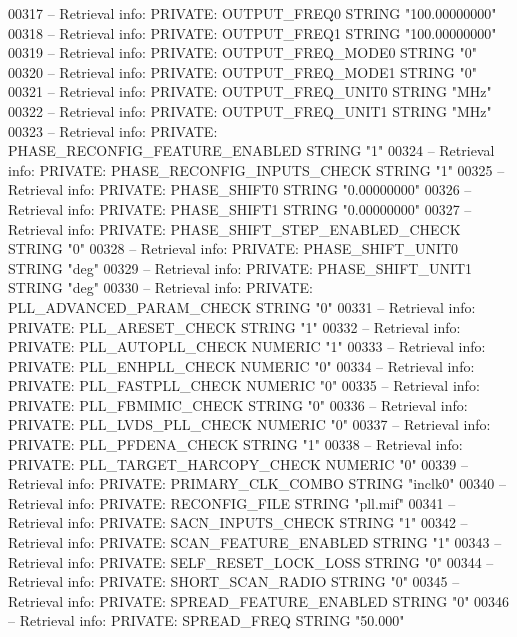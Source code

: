 \begin{DoxyCode}
{00317 \textcolor{keyword}{-- Retrieval info: PRIVATE: OUTPUT\_FREQ0 STRING "100.00000000"}
00318 \textcolor{keyword}{-- Retrieval info: PRIVATE: OUTPUT\_FREQ1 STRING "100.00000000"}
00319 \textcolor{keyword}{-- Retrieval info: PRIVATE: OUTPUT\_FREQ\_MODE0 STRING "0"}
00320 \textcolor{keyword}{-- Retrieval info: PRIVATE: OUTPUT\_FREQ\_MODE1 STRING "0"}
00321 \textcolor{keyword}{-- Retrieval info: PRIVATE: OUTPUT\_FREQ\_UNIT0 STRING "MHz"}
00322 \textcolor{keyword}{-- Retrieval info: PRIVATE: OUTPUT\_FREQ\_UNIT1 STRING "MHz"}
00323 \textcolor{keyword}{-- Retrieval info: PRIVATE: PHASE\_RECONFIG\_FEATURE\_ENABLED STRING "1"}
00324 \textcolor{keyword}{-- Retrieval info: PRIVATE: PHASE\_RECONFIG\_INPUTS\_CHECK STRING "1"}
00325 \textcolor{keyword}{-- Retrieval info: PRIVATE: PHASE\_SHIFT0 STRING "0.00000000"}
00326 \textcolor{keyword}{-- Retrieval info: PRIVATE: PHASE\_SHIFT1 STRING "0.00000000"}
00327 \textcolor{keyword}{-- Retrieval info: PRIVATE: PHASE\_SHIFT\_STEP\_ENABLED\_CHECK STRING "0"}
00328 \textcolor{keyword}{-- Retrieval info: PRIVATE: PHASE\_SHIFT\_UNIT0 STRING "deg"}
00329 \textcolor{keyword}{-- Retrieval info: PRIVATE: PHASE\_SHIFT\_UNIT1 STRING "deg"}
00330 \textcolor{keyword}{-- Retrieval info: PRIVATE: PLL\_ADVANCED\_PARAM\_CHECK STRING "0"}
00331 \textcolor{keyword}{-- Retrieval info: PRIVATE: PLL\_ARESET\_CHECK STRING "1"}
00332 \textcolor{keyword}{-- Retrieval info: PRIVATE: PLL\_AUTOPLL\_CHECK NUMERIC "1"}
00333 \textcolor{keyword}{-- Retrieval info: PRIVATE: PLL\_ENHPLL\_CHECK NUMERIC "0"}
00334 \textcolor{keyword}{-- Retrieval info: PRIVATE: PLL\_FASTPLL\_CHECK NUMERIC "0"}
00335 \textcolor{keyword}{-- Retrieval info: PRIVATE: PLL\_FBMIMIC\_CHECK STRING "0"}
00336 \textcolor{keyword}{-- Retrieval info: PRIVATE: PLL\_LVDS\_PLL\_CHECK NUMERIC "0"}
00337 \textcolor{keyword}{-- Retrieval info: PRIVATE: PLL\_PFDENA\_CHECK STRING "1"}
00338 \textcolor{keyword}{-- Retrieval info: PRIVATE: PLL\_TARGET\_HARCOPY\_CHECK NUMERIC "0"}
00339 \textcolor{keyword}{-- Retrieval info: PRIVATE: PRIMARY\_CLK\_COMBO STRING "inclk0"}
00340 \textcolor{keyword}{-- Retrieval info: PRIVATE: RECONFIG\_FILE STRING "pll.mif"}
00341 \textcolor{keyword}{-- Retrieval info: PRIVATE: SACN\_INPUTS\_CHECK STRING "1"}
00342 \textcolor{keyword}{-- Retrieval info: PRIVATE: SCAN\_FEATURE\_ENABLED STRING "1"}
00343 \textcolor{keyword}{-- Retrieval info: PRIVATE: SELF\_RESET\_LOCK\_LOSS STRING "0"}
00344 \textcolor{keyword}{-- Retrieval info: PRIVATE: SHORT\_SCAN\_RADIO STRING "0"}
00345 \textcolor{keyword}{-- Retrieval info: PRIVATE: SPREAD\_FEATURE\_ENABLED STRING "0"}
00346 \textcolor{keyword}{-- Retrieval info: PRIVATE: SPREAD\_FREQ STRING "50.000"}
}
\end{DoxyCode}
